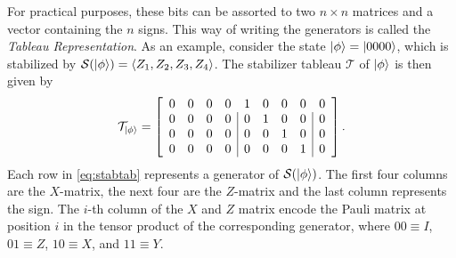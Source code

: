 For practical purposes, these bits can be assorted to two $n\times n$ matrices
and a vector containing the $n$ signs. This way of writing the generators is
called the \emph{Tableau Representation}. As an example, consider the state
$\ket{\phi}=\ket{0000}$, which is stabilized by $\mathcal{S}(\ket{\phi}) = \langle
Z_1, Z_2, Z_3, Z_4\rangle$. The stabilizer tableau $\mathcal{T}$ of
$\ket{\phi}$ is then given by
\begin{align}\label{eq:stabtab}
\mathcal{T}_{\ket{\phi}} = 
\left[
  \begin{array}{cccc|cccc|c}
    0 & 0 & 0 & 0 & 1 & 0 & 0 & 0 & 0 \\
    0 & 0 & 0 & 0 & 0 & 1 & 0 & 0 & 0 \\
    0 & 0 & 0 & 0 & 0 & 0 & 1 & 0 & 0 \\
    0 & 0 & 0 & 0 & 0 & 0 & 0 & 1 & 0
  \end{array}
\right]
.\end{align}
Each row in \cref{eq:stabtab} represents a generator of $\mathcal{S}(\ket{\phi})$. The
first four columns are the $X$-matrix, the next four are the $Z$-matrix and the
last column represents the sign. The $i$-th column of the $X$ and $Z$ matrix
encode the Pauli matrix at position $i$ in the tensor product of the
corresponding generator, where $00\equiv I$, $01\equiv Z$, $10\equiv X$, and
$11\equiv Y$. 

